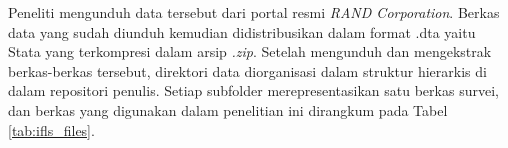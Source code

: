 Peneliti mengunduh data tersebut dari portal resmi \textit{RAND Corporation}. Berkas data yang sudah diunduh kemudian didistribusikan dalam format .dta yaitu Stata yang terkompresi dalam arsip \textit{.zip}. Setelah mengunduh dan mengekstrak berkas-berkas tersebut, direktori data diorganisasi dalam struktur hierarkis di dalam repositori penulis. Setiap subfolder merepresentasikan satu berkas survei, dan berkas yang digunakan dalam penelitian ini dirangkum pada Tabel \ref{tab:ifls_files}.


